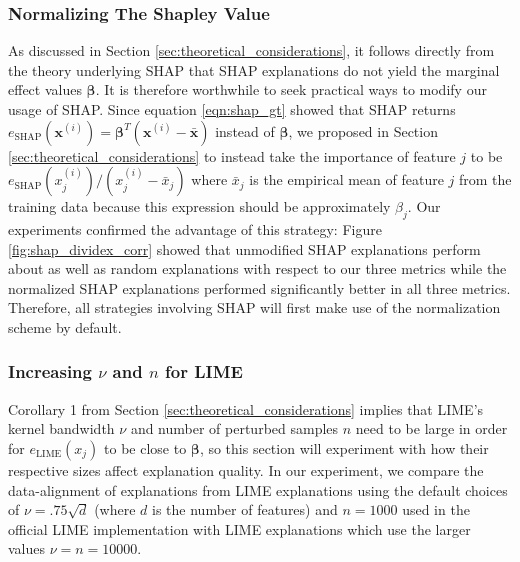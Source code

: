 \documentclass[12pt]{article}  %
\begin{document}
            \subsubsection{Normalizing The Shapley Value}
                As discussed in Section \ref{sec:theoretical_considerations}, it follows directly from the theory underlying SHAP that SHAP explanations do not yield the marginal effect values $\boldsymbol{\beta}$. It is therefore worthwhile to seek practical ways to modify our usage of SHAP. Since equation \ref{eqn:shap_gt} showed that SHAP returns $e_{\text{SHAP}}(\mathbf{x}^{(i)})=\boldsymbol{\beta}^T(\mathbf{x}^{(i)} - \bar{\mathbf{x}})$ instead of $\boldsymbol{\beta}$, we proposed in Section \ref{sec:theoretical_considerations} to instead take the importance of feature $j$ to be $e_{\text{SHAP}}(x^{(i)}_j) / (x^{(i)}_j - \bar{x}_j)$ where $\bar{x}_j$ is the empirical mean of feature $j$ from the training data because this expression should be approximately $\beta_j$. Our experiments confirmed the advantage of this strategy: Figure \ref{fig:shap_dividex_corr} showed that unmodified SHAP explanations perform about as well as random explanations with respect to our three metrics while the normalized SHAP explanations performed significantly better in all three metrics. Therefore, all strategies involving SHAP will first make use of the normalization scheme by default.




        
        \subsubsection{Increasing $\nu$ and $n$ for LIME } 
            \label{sec:lime_params}
            Corollary 1 from Section \ref{sec:theoretical_considerations} implies that LIME's kernel bandwidth $\nu$ and number of perturbed samples $n$ need to be large in order for $e_{\text{LIME}}(x_j)$ to be close to $\boldsymbol{\beta}$, so this section will experiment with how their respective sizes affect explanation quality. In our experiment, we compare the data-alignment of explanations from LIME explanations using the default choices of $\nu = .75\sqrt{d}$ (where $d$ is the number of features) and $n=1000$ used in the official LIME implementation \citep{ribeiro16lime} with LIME explanations which use the larger values $\nu=n=10000$. 
            
\end{document}
